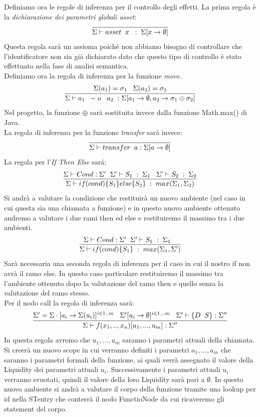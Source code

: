 \documentclass[12pt, a4paper]{report}
\begin{document}
Definiamo ora le regole di inferenza per il controllo degli effetti.
La prima regola è la \emph{dichiarazione dei parametri globali asset}:
\[
\infer{\Sigma \vdash asset \;\; x\;\;:\;\Sigma[x\rightarrow \emptyset]}{}    
\]
Questa regola sarà un assioma poichè non abbiamo bisogno di controllare che l'identificatore non sia già dichiarato dato che questo tipo di controllo è stato effettuato nella fase di analisi semantica.\\
Definiamo ora la regola di inferenza per la funzione \emph{move.}
\[
\infer{\Sigma \vdash a_1\;\; -o\;\;\; a_2\; : \Sigma[a_1 \rightarrow \emptyset , a_2 \rightarrow \sigma_1 \oplus \sigma_2]}{
\Sigma(a_1) = \sigma_1 \;\;\; \Sigma(a_2) = \sigma_2 }    
\]
Nel progetto, la funzione $\oplus$ sarà sostituita invece dalla funzione Math.max() di Java.\\
La regola di inferenza per la funzione \emph{transfer} sarà invece:
\[
\infer{\Sigma \vdash transfer \;\;a : \Sigma[a \rightarrow \emptyset] }{}    
\]
La regola per l'\emph{If Then Else} sará:
\[
\infer{\Sigma \vdash if(cond)\{S_1\}else\{S_2\} \;:\;max(\Sigma_1,\Sigma_2)}{\Sigma \vdash Cond :\Sigma'\;\;\Sigma' \vdash S_1\;:\;\Sigma_1 \;\;\; \Sigma' \vdash S_2\;:\;\Sigma_2}
\]
Si andrà a valutare la condizione che restituirà un nuovo ambiente (nel caso in cui questa sia una chiamata a funzione) e in questo nuovo ambiente ottenuto andremo a valutare i due rami then ed else e restituiremo il massimo tra i due ambienti. 
\[
\infer{\Sigma \vdash if(cond)\{S_1\} \;:\;max(\Sigma_1,\Sigma')}{\Sigma \vdash Cond :\Sigma'\;\;\Sigma' \vdash S_1\;:\;\Sigma_1 \;\;\;}
\]
Sarà necessaria una seconda regola di inferenza per il caso in cui il nostro if non avrà il ramo else. In questo caso particolare restituiremo il massimo tra l'ambiente ottenuto dopo la valutazione del ramo then e quello senza la valutazione del ramo stesso.\\
Per il nodo call la regola di inferenza sarà:
\[
\infer{\Sigma \vdash f(x_1,..,x_n)[u_1,...,u_m] : \Sigma''}
{\Sigma'=\Sigma \cdot [a_i \rightarrow \Sigma(u_i)]^{i\in 1..m}\;\;\; \Sigma'[u_i \rightarrow \emptyset]^{i\in 1...m}\;\;\; \Sigma' \vdash \{D\;\; S\} : \Sigma''}    
\]
In questa regola avremo che $u_1,...,u_m$ saranno i parametri attuali della chiamata. Si creerà un nuovo scope in cui verranno definiti i parametri $a_1, ..., a_m$ che saranno i parametri formali della funzione, ai quali verrà assegnato il valore della Liquidity dei parametri attuali $u_i$. Successivamente i parametri attuali $u_i$ verranno svuotati, quindi il valore della loro Liquidity sarà pari a $\emptyset$. In questo nuovo ambiente si andrà a valutare il corpo della funzione tramite una lookup per id nella STentry che conterrà il nodo FunctioNode da cui ricaveremo gli statement del corpo.\\
\end{document}
